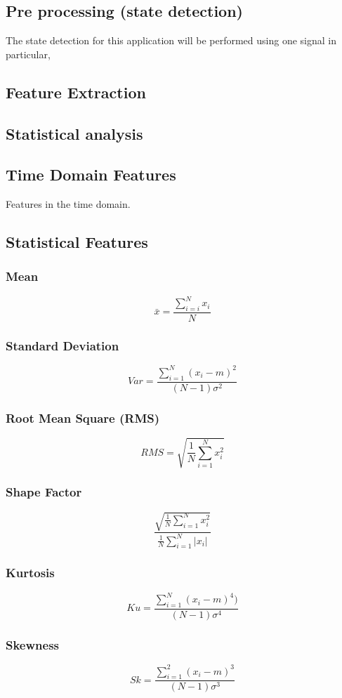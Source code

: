 \documentclass{article}
\begin{document}
\subsection{Pre processing (state detection)}
The state detection for this application will be performed using one signal in particular, 

\subsection{Feature Extraction}


\subsection{Statistical analysis}  

 
\subsection{Time Domain Features} 	
Features in the time domain.
\subsection{Statistical Features}
\subsubsection{Mean}
$$ \bar{x} = \frac{\sum^N_{i=i} x_i}{N} $$
\subsubsection{Standard Deviation}  
$$ Var =\frac{\sum^N_{i=1}(x_i-m)^2}{(N-1)\sigma^2} $$
\subsubsection{Root Mean Square (RMS)}
$$ RMS = \sqrt{\frac{1}{N} \sum^N_{i=1}x^2_i} $$
\subsubsection{Shape Factor}
$$ \frac{ \sqrt{\frac{1}{N} \sum^N_{i=1}x_i^2} }  {\frac{1}{N}\sum^N_{i=1}|x_i|} $$
\subsubsection{Kurtosis} 
$$ Ku = \frac{\sum^N_{i=1}(x_i-m)^4)}{(N-1)\sigma^4} $$ 
\subsubsection{Skewness} 
$$ Sk = \frac{\sum^2_{i=1}(x_i-m)^3}{(N-1)\sigma^3} $$
  
\end{document}
